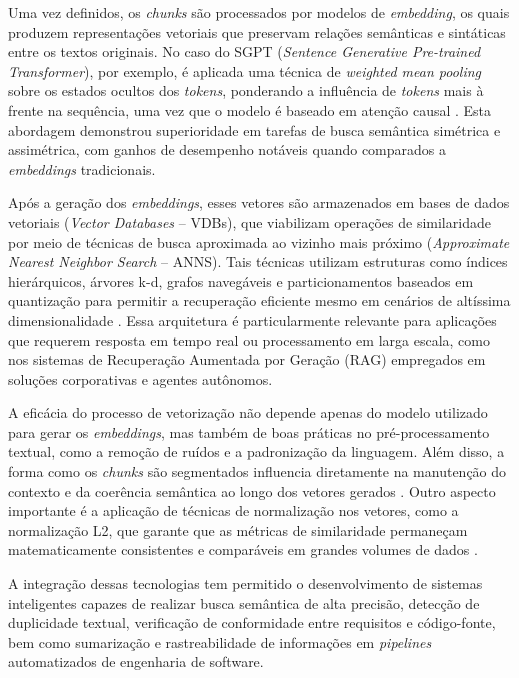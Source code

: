 Uma vez definidos, os \textit{chunks} são processados por modelos de \textit{embedding}, os quais produzem representações vetoriais que preservam relações semânticas e sintáticas entre os textos originais. No caso do SGPT (\textit{Sentence Generative Pre-trained Transformer}), por exemplo, é aplicada uma técnica de \textit{weighted mean pooling} sobre os estados ocultos dos \textit{tokens}, ponderando a influência de \textit{tokens} mais à frente na sequência, uma vez que o modelo é baseado em atenção causal . Esta abordagem demonstrou superioridade em tarefas de busca semântica simétrica e assimétrica, com ganhos de desempenho notáveis quando comparados a \textit{embeddings} tradicionais.

Após a geração dos \textit{embeddings}, esses vetores são armazenados em bases de dados vetoriais (\textit{Vector Databases} – VDBs), que viabilizam operações de similaridade por meio de técnicas de busca aproximada ao vizinho mais próximo (\textit{Approximate Nearest Neighbor Search} – ANNS). Tais técnicas utilizam estruturas como índices hierárquicos, árvores k-d, grafos navegáveis e particionamentos baseados em quantização para permitir a recuperação eficiente mesmo em cenários de altíssima dimensionalidade . Essa arquitetura é particularmente relevante para aplicações que requerem resposta em tempo real ou processamento em larga escala, como nos sistemas de Recuperação Aumentada por Geração (RAG) empregados em soluções corporativas e agentes autônomos.

A eficácia do processo de vetorização não depende apenas do modelo utilizado para gerar os \textit{embeddings}, mas também de boas práticas no pré-processamento textual, como a remoção de ruídos e a padronização da linguagem. Além disso, a forma como os \textit{chunks} são segmentados influencia diretamente na manutenção do contexto e da coerência semântica ao longo dos vetores gerados . Outro aspecto importante é a aplicação de técnicas de normalização nos vetores, como a normalização L2, que garante que as métricas de similaridade permaneçam matematicamente consistentes e comparáveis em grandes volumes de dados .

A integração dessas tecnologias tem permitido o desenvolvimento de sistemas inteligentes capazes de realizar busca semântica de alta precisão, detecção de duplicidade textual, verificação de conformidade entre requisitos e código-fonte, bem como sumarização e rastreabilidade de informações em \textit{pipelines} automatizados de engenharia de software.

